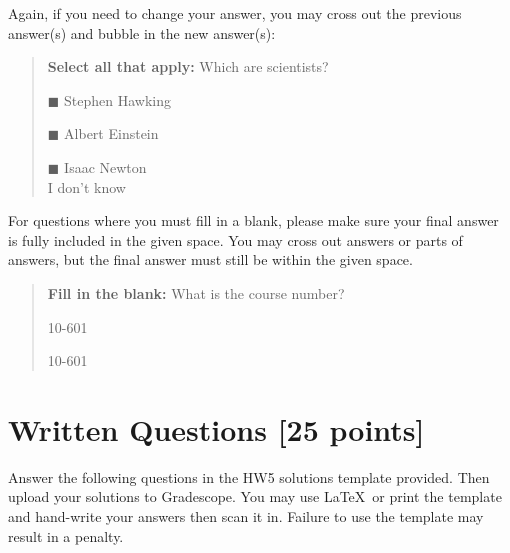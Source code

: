 \documentclass[11pt]{article}
\numberwithin{equation}{section} %
\numberwithin{figure}{section} %
\numberwithin{table}{section} %
\newcommand{\points}[1]{{\bf [#1 points]}}
\begin{document}
Again, if you need to change your answer, you may cross out the previous answer(s) and bubble in the new answer(s):

\begin{quote}
\textbf{Select all that apply:} Which are scientists?
    \begin{list}{}
    \item $\blacksquare$ Stephen Hawking 
    \item $\blacksquare$ Albert Einstein
    \item $\blacksquare$ Isaac Newton\\
    \xcancel{$\blacksquare$} I don't know
\end{list}
\end{quote}

For questions where you must fill in a blank, please make sure your final answer is fully included in the given space. You may cross out answers or parts of answers, but the final answer must still be within the given space.

\begin{quote}
\textbf{Fill in the blank:} What is the course number?

\begin{tcolorbox}[fit,height=1cm, width=4cm, blank, borderline={1pt}{-2pt},nobeforeafter]
    \begin{center}\huge10-601\end{center}
    \end{tcolorbox}\hspace{2cm}
    \begin{tcolorbox}[fit,height=1cm, width=4cm, blank, borderline={1pt}{-2pt},nobeforeafter]
    \begin{center}\huge10-601\end{center}
    \end{tcolorbox}
\end{quote}


\clearpage

\section{Written Questions \points{25}}
\label{sec:written}

Answer the following questions in the HW5 solutions template provided.  Then upload your solutions to Gradescope. You may use \LaTeX\ or print the template and hand-write your answers then scan it in. Failure to use the template may result in a penalty.
\end{document}
